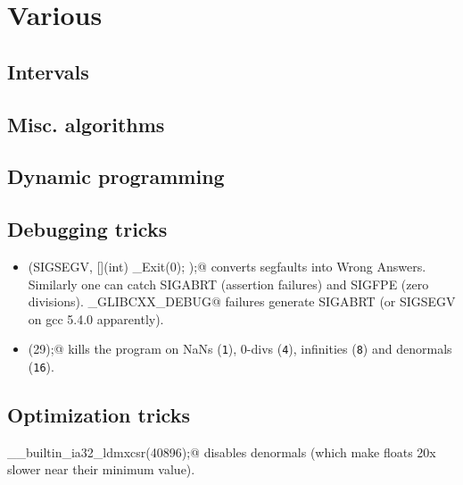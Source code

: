 \chapter{Various}

\section{Intervals}

\section{Misc. algorithms}

\section{Dynamic programming}

\section{Debugging tricks}
  \begin{itemize}
    \item \verb@signal(SIGSEGV, [](int) { _Exit(0); });@ converts segfaults into Wrong Answers.
      Similarly one can catch SIGABRT (assertion failures) and SIGFPE (zero divisions).
      \verb@_GLIBCXX_DEBUG@ failures generate SIGABRT (or SIGSEGV on gcc 5.4.0 apparently).
    \item \verb@feenableexcept(29);@ kills the program on NaNs (\texttt 1), 0-divs (\texttt 4), infinities (\texttt 8) and denormals (\texttt{16}).
  \end{itemize}

\section{Optimization tricks}
  \verb@__builtin_ia32_ldmxcsr(40896);@ disables denormals (which make floats 20x slower near their minimum value).
